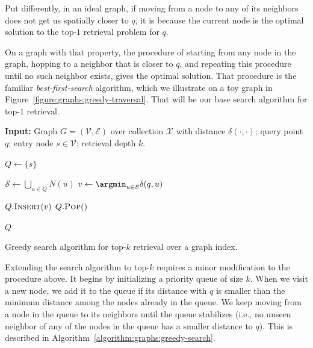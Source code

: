 \begin{svgraybox}
Put differently, in an ideal graph, if moving from a node to any of its neighbors
does not get us spatially closer to $q$, it is because the current
node is the optimal solution to the top-$1$ retrieval problem for $q$.
\end{svgraybox}

On a graph with that property,
the procedure of starting from any node in the graph,
hopping to a neighbor that is closer to $q$, and repeating this procedure until no such neighbor
exists, gives the optimal solution.
That procedure is the familiar \emph{best-first-search} algorithm,
which we illustrate on a toy graph in Figure~\ref{figure:graphs:greedy-traversal}.
That will be our base search algorithm for top-$1$ retrieval.

\begin{algorithm}[!t]
\SetAlgoLined
{\bf Input: }{Graph $G=(\mathcal{V}, \mathcal{E})$ over collection $\mathcal{X}$ 
with distance $\delta(\cdot, \cdot)$; query point $q$; entry node $s \in \mathcal{V}$;
retrieval depth $k$.}\\

\begin{algorithmic}[1]

\STATE $Q \leftarrow \{ s \}$ 

    \STATE $\mathcal{S} \leftarrow \bigcup_{u \in Q} N(u)$
    \STATE $v \leftarrow \argmin_{u \in \mathcal{S}} \delta(q, u)$

    \STATE $Q.\textsc{Insert}(v)$
        \STATE $Q.\textsc{Pop}()$ 
    \ENDIF
\ENDWHILE

\RETURN $Q$
\end{algorithmic}
\caption{Greedy search algorithm for top-$k$ retrieval over a graph index.}
\label{algorithm:graphs:greedy-search}
\end{algorithm}

Extending the search algorithm to top-$k$ requires a minor modification to the procedure above.
It begins by initializing a priority queue of size $k$. When we visit a new node, we add it to
the queue if its distance with $q$ is smaller than the minimum distance among the nodes already in the queue.
We keep moving from a node in the queue to its neighbors until the queue stabilizes (i.e., no
unseen neighbor of any of the nodes in the queue has a smaller distance to $q$).
This is described in Algorithm~\ref{algorithm:graphs:greedy-search}.


